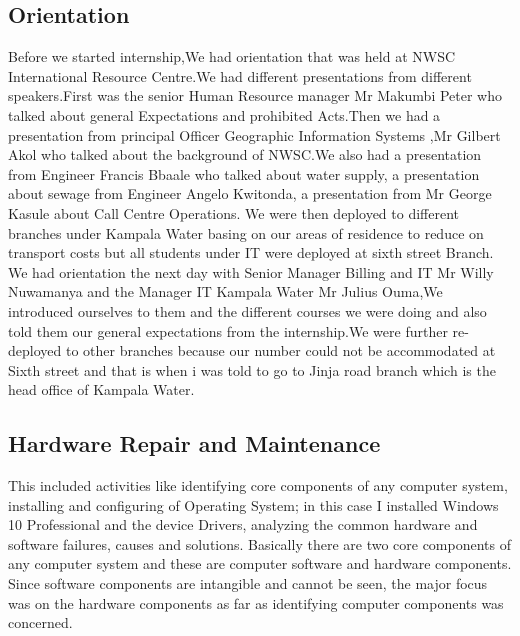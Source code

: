 \documentclass{article}
\begin{document}
 \subsection{Orientation}
Before we started internship,We had orientation that was held at NWSC International Resource Centre.We had different presentations from different speakers.First was the senior Human Resource manager Mr Makumbi Peter who talked about general Expectations and prohibited Acts.Then we had a presentation from principal Officer Geographic Information Systems ,Mr Gilbert Akol who talked about the background of  NWSC.We also had a presentation from Engineer Francis Bbaale who talked about water supply, a presentation about sewage from Engineer Angelo Kwitonda, a presentation from Mr George Kasule about Call Centre Operations. We were then deployed to different branches under Kampala Water basing on our areas of residence to reduce on transport costs but all students under IT were deployed at sixth street Branch. We had orientation the next day with Senior Manager Billing and IT Mr Willy Nuwamanya and the  Manager IT Kampala Water Mr Julius Ouma,We introduced ourselves to them and the different courses we were doing and also told them our general expectations from the internship.We were further re-deployed to other branches because our number could not be accommodated at Sixth street and that is when i was told to go to Jinja road branch which is the head office of Kampala Water.
\subsection{Hardware Repair and Maintenance }
This included activities like identifying core components of any computer system, installing and configuring of Operating System; in this case I installed Windows 10 Professional and the device Drivers, analyzing the common hardware and software failures, causes and solutions. Basically there are two core components of any computer system and these are
computer software and hardware components. Since software components are intangible and cannot be seen, the major focus was on the hardware components as far as identifying computer components was concerned.
\end{document}
